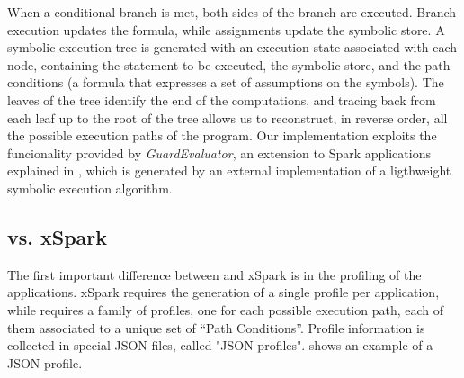 When a conditional branch is met, both sides of the branch are executed. Branch execution updates the formula, while assignments update the symbolic store. 
A symbolic execution tree is generated with an execution state associated with each node, containing the statement to be executed, the symbolic store, and the path conditions (a formula that expresses a set of assumptions on the symbols). The leaves of the tree identify the end of the computations, and tracing back from each leaf up to the root of the tree allows us to reconstruct, in reverse order, all the possible execution paths of the program. Our implementation exploits the funcionality provided by  \textit{GuardEvaluator}, an extension to Spark applications explained in , which is generated by an external implementation of a ligthweight symbolic execution algorithm.

\subsection{\tool vs. xSpark}
The first important difference between \tool and xSpark is in the profiling of the applications. xSpark requires the generation of a single \plan profile per application, while \tool requires a family of \plan profiles, one for each possible execution path, each of them associated to a unique set of “Path Conditions”. Profile information is collected in special JSON files, called "JSON profiles".  shows an example of a JSON profile.


